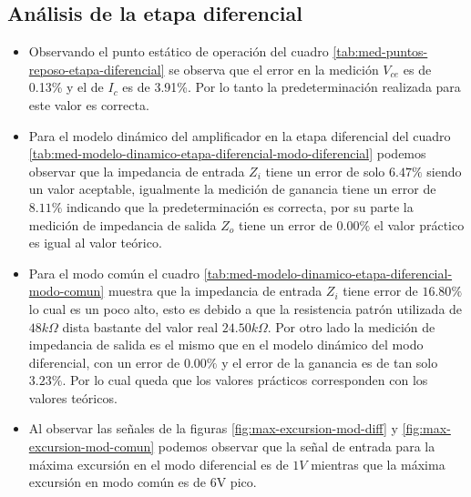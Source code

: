 \subsection{Análisis de la etapa diferencial}


\begin{itemize}
    \item Observando el punto estático de operación del cuadro \ref{tab:med-puntos-reposo-etapa-diferencial} se observa que el error en la medición $V_{ce}$ es de 0.13\% y el de $I_c$ es de 3.91\%. Por lo tanto la predeterminación realizada para este valor es correcta.
    \item Para el modelo dinámico del amplificador en la etapa diferencial del cuadro \ref{tab:med-modelo-dinamico-etapa-diferencial-modo-diferencial} podemos observar que la impedancia de entrada $Z_i$ tiene un error de solo $6.47\%$ siendo un valor aceptable, igualmente la medición de ganancia tiene un error de $8.11\%$ indicando que la predeterminación es correcta, por su parte la medición de impedancia de salida $Z_o$ tiene un error de $0.00\%$ el valor práctico es igual al valor teórico.
    \item Para el modo común el cuadro \ref{tab:med-modelo-dinamico-etapa-diferencial-modo-comun} muestra que la impedancia de entrada $Z_i$ tiene error de $16.80\%$ lo cual es un poco alto, esto es debido a que la resistencia patrón utilizada de $48k\Omega$ dista bastante del valor real $24.50k\Omega$. Por otro lado la medición de impedancia de salida es el mismo que en el modelo dinámico del modo diferencial, con un error de $0.00\%$ y el error de la ganancia es de tan solo $3.23\%$. Por lo cual queda que los valores prácticos corresponden con los valores teóricos.
    \item Al observar las señales de la figuras \ref{fig:max-excursion-mod-diff} y \ref{fig:max-excursion-mod-comun} podemos observar que la señal de entrada para la máxima excursión en el modo diferencial es de $1V$ mientras que la máxima excursión en modo común es de 6V pico.

\end{itemize}